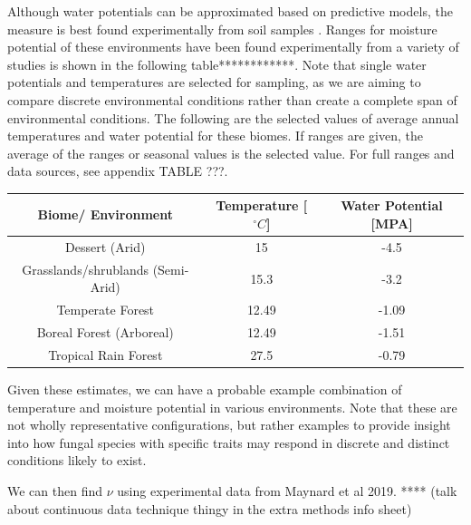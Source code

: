 \documentclass[12pt]{article}
\begin{document}
Although water potentials can be approximated based on predictive models, the measure is best found experimentally from soil samples \cite{Abkenar2019}. Ranges for moisture potential of these environments have been found experimentally from a variety of studies is shown in the following table************. Note that single water potentials and temperatures are selected for sampling, as we are aiming to compare discrete environmental conditions rather than create a complete span of environmental conditions. The following are the selected values of average annual temperatures and water potential for these biomes. If ranges are given, the average of the ranges or seasonal values is the selected value. For full ranges and data sources, see appendix TABLE ???.

\begin{table}[H]
	\begin{center}
		\begin{tabular}{|c c c|} 
			\hline
			Biome/ Environment & Temperature [$^{\circ}C$] & Water Potential [MPA]\\ [0.5ex] 
			\hline\hline
			Dessert (Arid) & 15 & -4.5 \\ 
			\hline
			Grasslands/shrublands (Semi-Arid) &15.3 & -3.2\\
			\hline
			Temperate Forest & 12.49 & -1.09 \\
			\hline
			Boreal Forest (Arboreal)& 12.49 &  -1.51 \\
			\hline
			Tropical Rain Forest & 27.5 & -0.79 \\
			\hline
		\end{tabular}
	\end{center}
\end{table}


Given these estimates, we can have a probable example combination of temperature and moisture potential in various environments. Note that these are not wholly representative configurations, but rather examples to provide insight into how fungal species with specific traits may respond in discrete and distinct conditions likely to exist. 

We can then find $\nu$ using experimental data from Maynard et al 2019. **** (talk about continuous data technique thingy in the extra methods info sheet)
\end{document}

